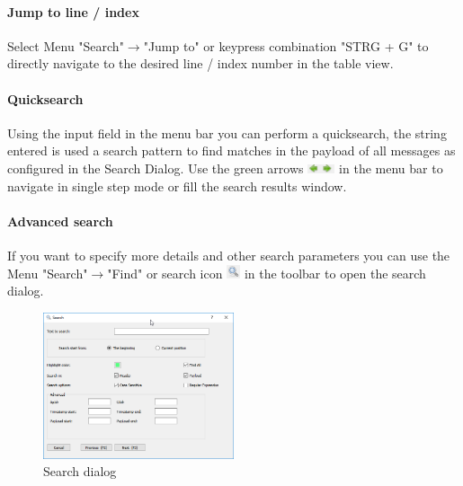 \documentclass[a4paper,11pt]{article}
\begin{document}
\paragraph{Jump to line / index}
Select Menu "Search"\ensuremath{\rightarrow}"Jump to" or keypress combination "STRG + G" to directly navigate to the desired line / index number in the table view.

\paragraph{Quicksearch}
Using the input field in the menu bar you can perform a quicksearch, the string entered is used a search pattern to find matches in the payload of all messages as configured in the Search Dialog. Use the 
green arrows \includegraphics[width=0.06\textwidth]{images/green_arrows.png} in the menu bar to navigate in single step mode or fill the search results window.

\paragraph{Advanced search}
If you want to specify more details and other search parameters you can use the Menu "Search"\ensuremath{\rightarrow}"Find" or
search icon \includegraphics[width=0.03\textwidth]{images/searchicon.png} in the toolbar to open the search dialog.

\begin{figure}[H]
 \centering
  \includegraphics[width=0.5\textwidth]{images/Search.png}
 \caption{Search dialog}
 \label{fig:searchdialog}
\end{figure}
\end{document}
